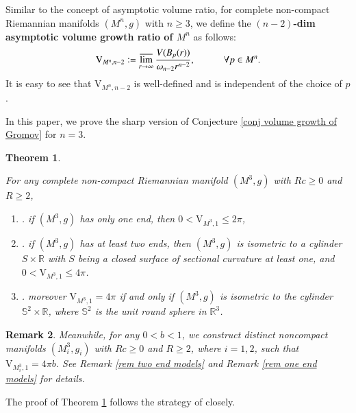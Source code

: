 \documentclass[11pt]{amsart}
\newtheorem{theorem}{Theorem}[section]
\newtheorem{remark}[theorem]{Remark}
\numberwithin{equation}{section}
\begin{document}
Similar to the concept of asymptotic volume ratio,  for complete  non-compact Riemannian manifolds $(M^n, g)$ with $n\geq 3$, we define the \textbf{$(n-2)$-dim asymptotic volume growth ratio of $M^n$} as follows:
\begin{align}
\mathrm{V}_{M^n, n- 2}\vcentcolon= \varlimsup\limits_{r\rightarrow\infty}\frac{V(B_p(r))}{\omega_{n- 2}r^{n- 2}},  \quad \quad \quad \forall p\in M^n.  \nonumber 
\end{align}
It is easy to see that $\mathrm{V}_{M^n, n- 2}$ is well-defined and is independent of the choice of $p$.

In this paper,  we prove the sharp version of Conjecture \ref{conj volume growth of Gromov} for $n= 3$.  
\begin{theorem}\label{thm main-1 }
{For any complete non-compact Riemannian manifold $(M^3, g)$ with $Rc\geq 0$ and $R\geq 2$, 
\begin{enumerate}
\item[(1)].  if $(M^3, g)$ has only one end,  then $\displaystyle 0< \mathrm{V}_{M^3, 1}\leq 2\pi$,
\item[(2)]. if $(M^3,g)$ has at least two ends, then $(M^3,g)$ is isometric to a cylinder $S\times\mathbb{R}$ with $S$ being a closed surface of sectional curvature at least one, and $\displaystyle 0< \mathrm{V}_{M^3, 1}\leq 4\pi$. 
\item[(3)].  moreover $\mathrm{V}_{M^3, 1}= 4\pi$ if and only if $(M^3,g)$ is isometric to the cylinder $\mathbb{S}^2\times\mathbb{R}$,  where $\mathbb{S}^2$ is the unit round sphere in $\mathbb{R}^3$.
\end{enumerate}
}
\end{theorem}

\begin{remark}\label{rem uniqueness of rigidity}
{Meanwhile,  for any $0<b<1$,  we construct distinct noncompact manifolds $(M_i^3,g_i)$ with  $Rc\geq 0$ and $R\geq 2$,  where $i=1, 2$,  such that   $\displaystyle \mathrm{V}_{M_i^3, 1}=4\pi b$. See Remark \ref{rem two end models} and Remark \ref{rem one end models} for details.
}
\end{remark}

The proof of Theorem \ref{thm main-1 } follows the strategy of \cite{CLS} closely.  
\end{document}

